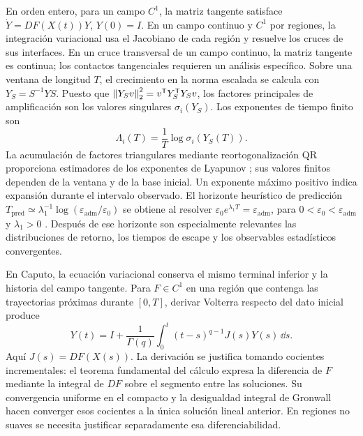 En orden entero, para un campo \(C^1\), la matriz tangente satisface
\(\dot Y=DF(X(t))Y\), \(Y(0)=I\). En un campo continuo y \(C^1\) por
regiones, la integración variacional usa el Jacobiano de cada región y
resuelve los cruces de sus interfaces. En un cruce transversal de un campo
continuo, la matriz tangente es continua; los contactos tangenciales
requieren un análisis específico. Sobre una ventana de longitud $T$, el
crecimiento en la norma escalada se calcula con
$Y_S=S^{-1}YS$. Puesto que
$\left\lVert Y_Sv\right\rVert_2^2=v^{\mathsf T}Y_S^{\mathsf T}Y_Sv$, los factores
principales de amplificación son los valores singulares $\sigma_i(Y_S)$.
Los exponentes de tiempo finito son
\begin{equation}
 \Lambda_i(T)=\frac1T\log\sigma_i(Y_S(T)).
 \label{bre:num:ftle}
\end{equation}
La acumulación de factores triangulares mediante reortogonalización QR
proporciona estimadores de los exponentes de Lyapunov
\cite{Benettin1980a}; sus valores finitos dependen de la ventana y de la
base inicial. Un exponente máximo positivo indica expansión durante el
intervalo observado. El horizonte heurístico de predicción
$T_{\mathrm{pred}}\simeq\lambda_1^{-1}
\log(\varepsilon_{\mathrm{adm}}/\varepsilon_0)$ se obtiene al resolver
$\varepsilon_0e^{\lambda_1T}=\varepsilon_{\mathrm{adm}}$, para
$0<\varepsilon_0<\varepsilon_{\mathrm{adm}}$ y $\lambda_1>0$
\cite{VallejoSanjuan2017Predictability}. Después de ese horizonte son
especialmente relevantes las distribuciones de retorno, los tiempos de
escape y los observables estadísticos convergentes.

En Caputo, la ecuación variacional conserva el mismo terminal inferior y
la historia del campo tangente. Para $F\in C^1$ en una región que contenga
las trayectorias próximas durante $[0,T]$, derivar Volterra respecto del
dato inicial produce
\begin{equation}
 Y(t)=I+\frac1{\Gamma(q)}\int_0^t(t-s)^{q-1}J(s)Y(s)\,\dd s.
 \label{bre:num:tangent-memory}
\end{equation}
Aquí $J(s)=DF(X(s))$. La derivación se justifica tomando cocientes
incrementales: el teorema
fundamental del cálculo expresa la diferencia de $F$ mediante la integral
de $DF$ sobre el segmento entre las soluciones. Su convergencia uniforme
en el compacto y la desigualdad integral de Gronwall hacen converger esos
cocientes a la única solución lineal anterior. En regiones no suaves se
necesita justificar separadamente esa diferenciabilidad.

